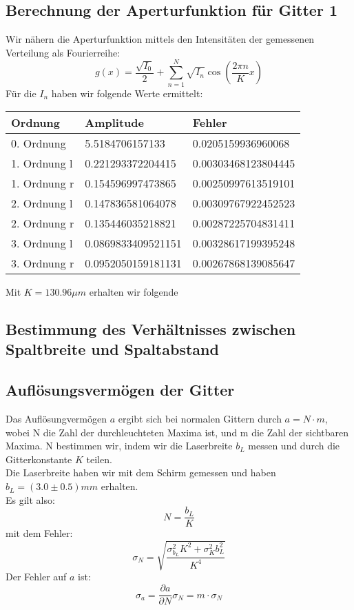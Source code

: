 \subsection{Berechnung der Aperturfunktion f\"ur Gitter 1}

Wir nähern die Aperturfunktion mittels den Intensit\"aten der gemessenen Verteilung als Fourierreihe:
$$g(x) = \frac{\sqrt{I_0}}{2} + \sum_{n=1}^N \sqrt{I_n}\cos\left(\frac{2\pi n}{K}x \right)$$
F\"ur die $I_n$ haben wir folgende Werte ermittelt:

\begin{tabular}{lll}
 \toprule
Ordnung & Amplitude & Fehler \\
\midrule
0. Ordnung & 5.5184706157133 & 0.0205159936960068 \\
1. Ordnung l & 0.221293372204415 & 0.00303468123804445 \\
1. Ordnung r & 0.154596997473865 & 0.00250997613519101 \\
2. Ordnung l & 0.147836581064078 & 0.00309767922452523 \\
2. Ordnung r & 0.135446035218821 & 0.00287225704831411 \\
3. Ordnung l & 0.0869833409521151 & 0.00328617199395248 \\
3. Ordnung r & 0.0952050159181131 & 0.00267868139085647 \\
\bottomrule
\end{tabular}



Mit $K = 130.96 \mu m $ erhalten wir folgende  
\begin{figure}[h!]
\caption{}
\end{figure}


\subsection{Bestimmung des Verh\"altnisses zwischen Spaltbreite und Spaltabstand}

\subsection{Aufl\"osungsverm\"ogen der Gitter}

Das Aufl\"osungverm\"ogen $a$ ergibt sich bei normalen Gittern durch $a=N\cdot m$, wobei N die Zahl der durchleuchteten Maxima ist, und m die Zahl der sichtbaren Maxima. N bestimmen wir, indem wir die Laserbreite $b_L$ messen und durch die Gitterkonstante $K$ teilen.\\
Die Laserbreite haben wir mit dem Schirm gemessen und haben $b_L = (3.0 \pm 0.5) mm$ erhalten.\\
Es gilt also: $$N = \frac{b_L}{K}$$
mit dem Fehler: $$\sigma_N = \sqrt{\frac{\sigma_{b_L}^2K^2 + \sigma_K^2b_L^2}{K^4}}$$
Der Fehler auf $a$ ist: $$\sigma_a = \frac{\partial a}{\partial N}\sigma_N = m\cdot \sigma_N$$

